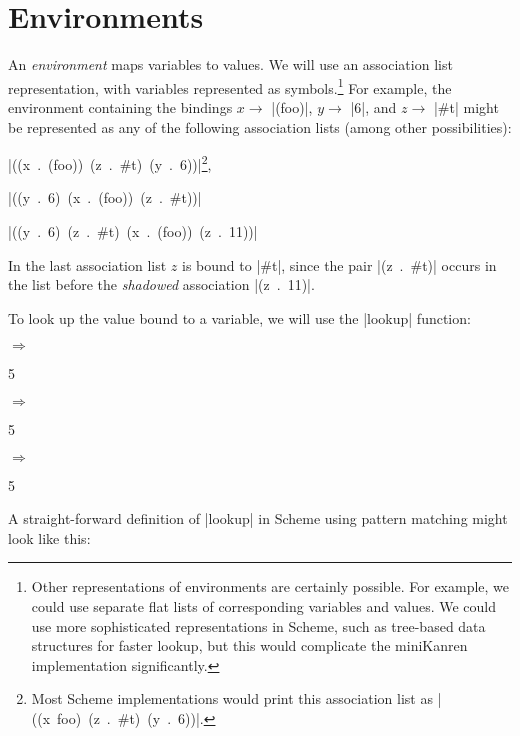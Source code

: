 \chapter{Environments}

An \emph{environment} maps variables to values.
%
We will use an association list representation, with variables
represented as symbols.\footnote{Other representations of environments
  are certainly possible.  For example, we could use separate flat
  lists of corresponding variables and values.  We could use more
  sophisticated representations in Scheme, such as tree-based data
  structures for faster lookup, but this would complicate the
  miniKanren implementation significantly.}
For example, the environment containing the bindings
%
$x \rightarrow$ \schemeresult|(foo)|,
%
$y \rightarrow$ \schemeresult|6|,
%
and 
%
$z \rightarrow$ \schemeresult|#t|
%
might be represented as any of the following association lists (among other possibilities):

\noindent\mbox{\schemeresult|((x . (foo)) (z . #t) (y . 6))|}\footnote{Most Scheme implementations would print this association list as \mbox{\schemeresult|((x foo) (z . #t) (y . 6))|}.},

\noindent\mbox{\schemeresult|((y . 6) (x . (foo)) (z . #t))|}

\noindent\mbox{\schemeresult|((y . 6) (z . #t) (x . (foo)) (z . 11))|}

\noindent
In the last association list $z$ is bound to \schemeresult|#t|, since the pair \mbox{\schemeresult|(z . #t)|}
occurs in the list before the \emph{shadowed} association \mbox{\schemeresult|(z . 11)|}.

To look up the value bound to a variable, we will use the \scheme|lookup| function:

\noindent{} $\Rightarrow$
\begin{schemeresponsebox}5\end{schemeresponsebox}

\noindent{} $\Rightarrow$
\begin{schemeresponsebox}5\end{schemeresponsebox}

\noindent{} $\Rightarrow$
\begin{schemeresponsebox}5\end{schemeresponsebox}

A straight-forward definition of \scheme|lookup| in Scheme using
pattern matching might look like this:

